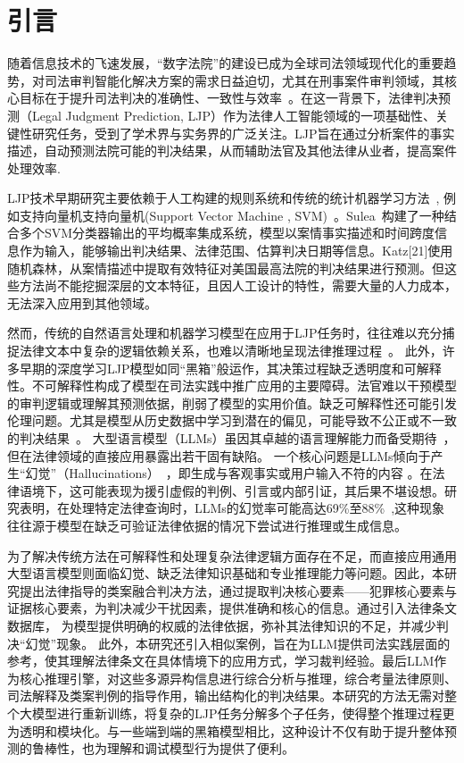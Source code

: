 \section{\heiti 引言}

随着信息技术的飞速发展，“数字法院”的建设已成为全球司法领域现代化的重要趋势，对司法审判智能化解决方案的需求日益迫切，尤其在刑事案件审判领域，其核心目标在于提升司法判决的准确性、一致性与效率~\cite{aletras2016predicting}。在这一背景下，法律判决预测（Legal Judgment Prediction, LJP）作为法律人工智能领域的一项基础性、关键性研究任务，受到了学术界与实务界的广泛关注。LJP旨在通过分析案件的事实描述，自动预测法院可能的判决结果，从而辅助法官及其他法律从业者，提高案件处理效率.

LJP技术早期研究主要依赖于人工构建的规则系统和传统的统计机器学习方法~\cite{katz2017general,keown1980mathematical}, 例如支持向量机支持向量机(Support Vector  Machine , SVM)~\cite{boella2011using,kim2015legal}。Sulea~\cite{sulea2017exploring}构建了一种结合多个SVM分类器输出的平均概率集成系统，模型以案情事实描述和时间跨度信息作为输入，能够输出判决结果、法律范围、估算判决日期等信息。Katz[21]使用随机森林，从案情描述中提取有效特征对美国最高法院的判决结果进行预测。但这些方法尚不能挖掘深层的文本特征，且因人工设计的特性，需要大量的人力成本，无法深入应用到其他领域。

然而，传统的自然语言处理和机器学习模型在应用于LJP任务时，往往难以充分捕捉法律文本中复杂的逻辑依赖关系，也难以清晰地呈现法律推理过程~\cite{lin2012exploiting,liu2004case}。
此外，许多早期的深度学习LJP模型如同“黑箱”般运作，其决策过程缺乏透明度和可解释性。不可解释性构成了模型在司法实践中推广应用的主要障碍\cite{ling2017program,ma2021law}。法官难以干预模型的审判逻辑或理解其预测依据，削弱了模型的实用价值。缺乏可解释性还可能引发伦理问题。尤其是模型从历史数据中学习到潜在的偏见，可能导致不公正或不一致的判决结果~\cite{luo2017learning,lv2022improving}。
大型语言模型（LLMs）虽因其卓越的语言理解能力而备受期待~\cite{jiang2023legal}，但在法律领域的直接应用暴露出若干固有缺陷。
一个核心问题是LLMs倾向于产生“幻觉”（Hallucinations）~\cite{lewis2020retrieval}，即生成与客观事实或用户输入不符的内容 。在法律语境下，这可能表现为援引虚假的判例、引言或内部引证，其后果不堪设想。研究表明，在处理特定法律查询时，LLMs的幻觉率可能高达69\%至88\%~\cite{Dahl_2024},这种现象往往源于模型在缺乏可验证法律依据的情况下尝试进行推理或生成信息。

为了解决传统方法在可解释性和处理复杂法律逻辑方面存在不足，而直接应用通用大型语言模型则面临幻觉、缺乏法律知识基础和专业推理能力等问题。因此，本研究提出法律指导的类案融合判决方法，通过提取判决核心要素——犯罪核心要素与证据核心要素，为判决减少干扰因素，提供准确和核心的信息。通过引入法律条文数据库， 为模型提供明确的权威的法律依据，弥补其法律知识的不足，并减少判决“幻觉”现象。 此外，本研究还引入相似案例，旨在为LLM提供司法实践层面的参考，使其理解法律条文在具体情境下的应用方式，学习裁判经验。最后LLM作为核心推理引擎，对这些多源异构信息进行综合分析与推理，综合考量法律原则、司法解释及类案判例的指导作用，输出结构化的判决结果。本研究的方法无需对整个大模型进行重新训练，将复杂的LJP任务分解多个子任务，使得整个推理过程更为透明和模块化。与一些端到端的黑箱模型相比，这种设计不仅有助于提升整体预测的鲁棒性，也为理解和调试模型行为提供了便利。

